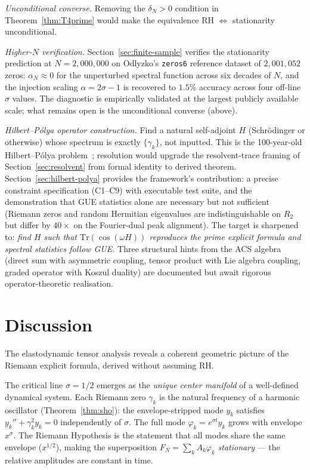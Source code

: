 \documentclass[11pt,a4paper]{article}
\theoremstyle{plain}
\theoremstyle{definition}
\theoremstyle{remark}
\begin{document}
\textit{Unconditional converse.}
Removing the $\delta_N > 0$ condition in Theorem~\ref{thm:T4prime}
would make the equivalence RH $\Leftrightarrow$ stationarity unconditional.

\textit{Higher-$N$ verification.}
Section~\ref{sec:finite-sample} verifies the stationarity prediction
at $N = 2{,}000{,}000$ on Odlyzko's \texttt{zeros6} reference dataset
of $2{,}001{,}052$ zeros: $\alpha_N \approx 0$ for the unperturbed
spectral function across six decades of $N$, and the
injection scaling $\alpha = 2\sigma - 1$ is recovered to $1.5\%$
accuracy across four off-line $\sigma$ values. The diagnostic is
empirically validated at the largest publicly available scale; what
remains open is the unconditional converse (above).

\textit{Hilbert--P\'{o}lya operator construction.}
Find a natural self-adjoint $H$ (Schr\"{o}dinger or otherwise)
whose spectrum is exactly $\{\gamma_k\}$, not inputted.  This is
the 100-year-old Hilbert--P\'{o}lya
problem~\cite{BerryKeating1999, Connes1999}; resolution would
upgrade the resolvent-trace framing of Section~\ref{sec:resolvent}
from formal identity to derived theorem.  Section~\ref{sec:hilbert-polya}
provides the framework's contribution: a precise constraint specification
(C1--C9) with executable test suite, and the demonstration that GUE
statistics alone are necessary but not sufficient (Riemann zeros and
random Hermitian eigenvalues are indistinguishable on $R_2$ but differ by
$40\times$ on the Fourier-dual peak alignment).  The target is sharpened
to: \emph{find $H$ such that $\mathrm{Tr}(\cos(\omega H))$ reproduces the
prime explicit formula and spectral statistics follow GUE.}  Three
structural hints from the ACS algebra (direct sum with asymmetric coupling,
tensor product with Lie algebra coupling, graded operator with Koszul
duality) are documented but await rigorous operator-theoretic realisation.

\section{Discussion}
\label{sec:discussion}

The elastodynamic tensor analysis reveals a coherent geometric picture
of the Riemann explicit formula, derived without assuming RH.

The critical line $\sigma = 1/2$ emerges as the \emph{unique center manifold}
of a well-defined dynamical system.  Each Riemann zero $\gamma_k$ is the
natural frequency of a harmonic oscillator (Theorem~\ref{thm:sho}): the
envelope-stripped mode $y_k$ satisfies $y_k'' + \gamma_k^2 y_k = 0$
independently of $\sigma$.  The full mode $\varphi_k = e^{\sigma t} y_k$
grows with envelope $x^\sigma$.  The Riemann Hypothesis is the statement
that all modes share the same envelope ($x^{1/2}$), making the superposition
$F_N = \sum_k A_k \varphi_k$ \emph{stationary} --- the relative amplitudes
are constant in time.
\end{document}
